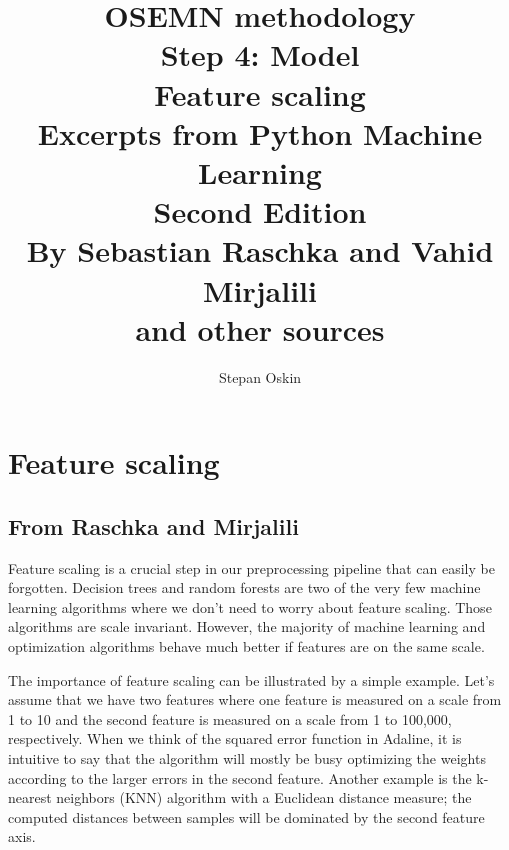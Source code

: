 \documentclass[11pt]{article}
\begin{document}
    \title{OSEMN methodology \\
    Step 4: Model \\
    Feature scaling \\
    Excerpts from Python Machine Learning \\
    Second Edition \\
    By Sebastian Raschka and Vahid Mirjalili\cite{RaschkaMirjalili2017} \\
    and other sources}

    \author{Stepan Oskin}

    \maketitle

    \begin{abstract}

    \end{abstract}

    \section{Feature scaling} \label{sec:feature_scaling}

    \subsection{From Raschka and Mirjalili\cite{RaschkaMirjalili2017}} \label{subsec:feature_scaling_raschka}

    Feature scaling is a crucial step in our preprocessing pipeline that can easily be forgotten.
    Decision trees and random forests are two of the very few machine learning algorithms where we don't need to worry about feature scaling.
    Those algorithms are scale invariant.
    However, the majority of machine learning and optimization algorithms behave much better if features are on the same scale.

    The importance of feature scaling can be illustrated by a simple example.
    Let's assume that we have two features where one feature is measured on a scale from 1 to 10 and the second feature is measured on a scale from 1 to 100,000, respectively.
    When we think of the squared error function in Adaline, it is intuitive to say that the algorithm will mostly be busy optimizing the weights according to the larger errors in the second feature.
    Another example is the k-nearest neighbors (KNN) algorithm with a Euclidean distance measure;
    the computed distances between samples will be dominated by the second feature axis.
\end{document}
